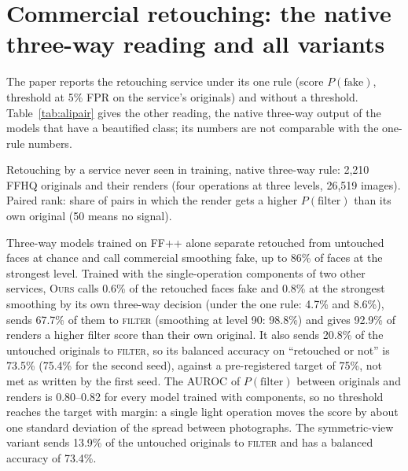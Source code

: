 \documentclass[10pt]{article}
\newcommand{\ours}{\textsc{Ours}}
\begin{document}
\section{Commercial retouching: the native three-way reading and all variants}
The paper reports the retouching service under its one rule (score $P(\text{fake})$, threshold at 5\% FPR on the
service's originals) and without a threshold. Table~\ref{tab:alipair} gives the other reading, the native three-way
output of the models that have a beautified class; its numbers are not comparable with the one-rule numbers.
\begin{table}[H]
\centering
\caption{Retouching by a service never seen in training, native three-way rule: 2,210 FFHQ originals and their renders
(four operations at three levels, 26,519 images). Paired rank: share of pairs in which the render gets a higher
$P(\text{filter})$ than its own original (50 means no signal).}
\label{tab:alipair}
\footnotesize
\begin{adjustbox}{max width=\linewidth}\end{adjustbox}
\end{table}
Three-way models trained on FF++ alone separate retouched from untouched faces at chance and call commercial smoothing
fake, up to 86\% of faces at the strongest level. Trained with the single-operation components of two other services,
\ours{} calls 0.6\% of the retouched faces fake and 0.8\% at the strongest smoothing by its own three-way decision
(under the one rule: 4.7\% and 8.6\%), sends 67.7\% of them to \textsc{filter} (smoothing at level 90: 98.8\%) and
gives 92.9\% of renders a higher filter score than their own original. It also sends 20.8\% of the untouched originals
to \textsc{filter}, so its balanced accuracy on ``retouched or not'' is 73.5\% (75.4\% for the second seed), against a
pre-registered target of 75\%, not met as written by the first seed. The AUROC of $P(\text{filter})$ between originals
and renders is 0.80--0.82 for every model trained with components, so no threshold reaches the target with margin: a
single light operation moves the score by about one standard deviation of the spread between photographs. The
symmetric-view variant sends 13.9\% of the untouched originals to \textsc{filter} and has a balanced accuracy of 73.4\%.
\end{document}
